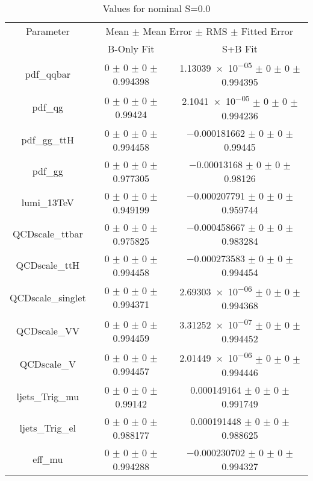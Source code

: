 \begin{table}
\centering
\caption{Values for nominal S=0.0}
\begin{tabular}{ccc}
\toprule
Parameter & \multicolumn{2}{c}{Mean $\pm$ Mean Error $\pm$ RMS $\pm$ Fitted Error}\\
 & B-Only Fit & S+B Fit\\
\midrule
pdf\_qqbar & \num{0} $\pm$ \num{0} $\pm$ \num{0} $\pm$ \num{0.994398} & \num{1.13039e-05} $\pm$ \num{0} $\pm$ \num{0} $\pm$ \num{0.994395}\\
pdf\_qg & \num{0} $\pm$ \num{0} $\pm$ \num{0} $\pm$ \num{0.99424} & \num{2.1041e-05} $\pm$ \num{0} $\pm$ \num{0} $\pm$ \num{0.994236}\\
pdf\_gg\_ttH & \num{0} $\pm$ \num{0} $\pm$ \num{0} $\pm$ \num{0.994458} & \num{-0.000181662} $\pm$ \num{0} $\pm$ \num{0} $\pm$ \num{0.99445}\\
pdf\_gg & \num{0} $\pm$ \num{0} $\pm$ \num{0} $\pm$ \num{0.977305} & \num{-0.00013168} $\pm$ \num{0} $\pm$ \num{0} $\pm$ \num{0.98126}\\
lumi\_13TeV & \num{0} $\pm$ \num{0} $\pm$ \num{0} $\pm$ \num{0.949199} & \num{-0.000207791} $\pm$ \num{0} $\pm$ \num{0} $\pm$ \num{0.959744}\\
QCDscale\_ttbar & \num{0} $\pm$ \num{0} $\pm$ \num{0} $\pm$ \num{0.975825} & \num{-0.000458667} $\pm$ \num{0} $\pm$ \num{0} $\pm$ \num{0.983284}\\
QCDscale\_ttH & \num{0} $\pm$ \num{0} $\pm$ \num{0} $\pm$ \num{0.994458} & \num{-0.000273583} $\pm$ \num{0} $\pm$ \num{0} $\pm$ \num{0.994454}\\
QCDscale\_singlet & \num{0} $\pm$ \num{0} $\pm$ \num{0} $\pm$ \num{0.994371} & \num{2.69303e-06} $\pm$ \num{0} $\pm$ \num{0} $\pm$ \num{0.994368}\\
QCDscale\_VV & \num{0} $\pm$ \num{0} $\pm$ \num{0} $\pm$ \num{0.994459} & \num{3.31252e-07} $\pm$ \num{0} $\pm$ \num{0} $\pm$ \num{0.994452}\\
QCDscale\_V & \num{0} $\pm$ \num{0} $\pm$ \num{0} $\pm$ \num{0.994457} & \num{2.01449e-06} $\pm$ \num{0} $\pm$ \num{0} $\pm$ \num{0.994446}\\
ljets\_Trig\_mu & \num{0} $\pm$ \num{0} $\pm$ \num{0} $\pm$ \num{0.99142} & \num{0.000149164} $\pm$ \num{0} $\pm$ \num{0} $\pm$ \num{0.991749}\\
ljets\_Trig\_el & \num{0} $\pm$ \num{0} $\pm$ \num{0} $\pm$ \num{0.988177} & \num{0.000191448} $\pm$ \num{0} $\pm$ \num{0} $\pm$ \num{0.988625}\\
eff\_mu & \num{0} $\pm$ \num{0} $\pm$ \num{0} $\pm$ \num{0.994288} & \num{-0.000230702} $\pm$ \num{0} $\pm$ \num{0} $\pm$ \num{0.994327}\\

\end{tabular}
\end{table}

